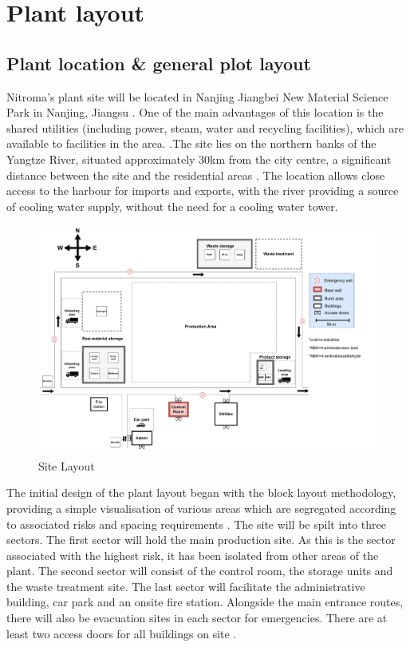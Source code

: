 \section{Plant layout}

\subsection{Plant location \& general plot layout}

Nitroma’s plant site will be located in  Nanjing Jiangbei New Material Science Park in Nanjing, Jiangsu . One of the main advantages of this location is the shared utilities (including power, steam, water and recycling facilities), which are available to facilities in the area. \cite{independent_commodity_intelligence_services_china_2007}.The site lies on the northern banks of the Yangtze River, situated approximately 30km from the city centre, a significant distance between the site and the residential areas \cite{zeng_divergent_2011}. The location allows close access to the harbour for imports and exports, with the river providing a source of cooling water supply, without the need for a cooling water tower.

\begin{figure}
\centering
\includegraphics[width=\linewidth]{chapters/5-safety-layout-environment/figures/Plant layout 3.pdf}
\caption{Site Layout}
\label{fig:site}
\end{figure}

The initial design of the plant layout began with the block layout methodology, providing a simple visualisation of various areas which are segregated according to associated risks and spacing requirements \cite{center_for_chemical_process_safety_site_2010}. The site will be spilt into three sectors. The first sector will hold the main production site. As this is the sector associated with the highest risk, it has been isolated from other areas of the plant. The second sector will consist of the control room, the storage units and the waste treatment site. The last sector will facilitate the administrative building, car park and an onsite fire station. Alongside the main entrance routes, there will also be evacuation sites in each sector for emergencies. There are at least two access doors for all buildings on site \cite{aiche_dows_1994}. 

